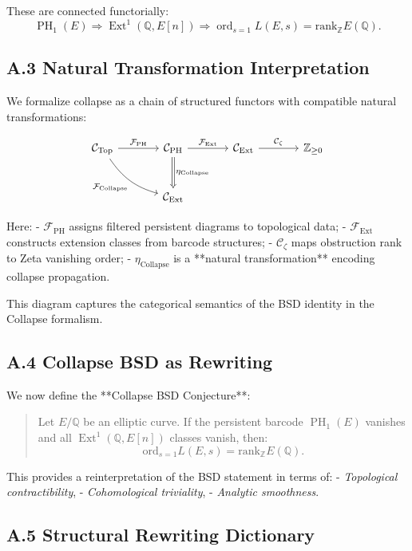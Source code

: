 \documentclass[11pt]{article}
\DeclareMathOperator{\Ext}{Ext}
\DeclareMathOperator{\PH}{PH}
\DeclareMathOperator{\ord}{ord}
\newcommand{\QQ}{\mathbb{Q}}
\newcommand{\ZZ}{\mathbb{Z}}
\begin{document}
These are connected functorially:
\[
\PH_1(E) \Rightarrow \Ext^1(\QQ, E[n]) \Rightarrow \ord_{s=1} L(E,s) = \mathrm{rank}_{\ZZ} E(\QQ).
\]

\subsection*{A.3 Natural Transformation Interpretation}

We formalize collapse as a chain of structured functors with compatible natural transformations:

\[
\begin{tikzcd}[column sep=large, row sep=large]
\mathcal{C}_{\mathrm{Top}} \arrow[r, "\mathcal{F}_{\mathrm{PH}}"]
\arrow[dr, bend right=20, "\mathcal{F}_{\mathrm{Collapse}}"'] &
\mathcal{C}_{\mathrm{PH}} \arrow[d, Rightarrow, "\eta_{\mathrm{Collapse}}"] \arrow[r, "\mathcal{F}_{\mathrm{Ext}}"] &
\mathcal{C}_{\mathrm{Ext}} \arrow[r, "\mathcal{C}_{\zeta}"] &
\mathbb{Z}_{\geq 0} \\
& \mathcal{C}_{\mathrm{Ext}} &
&
\end{tikzcd}
\]

Here:
- $\mathcal{F}_{\mathrm{PH}}$ assigns filtered persistent diagrams to topological data;
- $\mathcal{F}_{\mathrm{Ext}}$ constructs extension classes from barcode structures;
- $\mathcal{C}_{\zeta}$ maps obstruction rank to Zeta vanishing order;
- $\eta_{\mathrm{Collapse}}$ is a **natural transformation** encoding collapse propagation.

This diagram captures the categorical semantics of the BSD identity in the Collapse formalism.

\subsection*{A.4 Collapse BSD as Rewriting}

We now define the **Collapse BSD Conjecture**:

\begin{quote}
Let $E/\QQ$ be an elliptic curve. If the persistent barcode $\PH_1(E)$ vanishes and all $\Ext^1(\QQ,E[n])$ classes vanish, then:
\[
\mathrm{ord}_{s=1} L(E,s) = \mathrm{rank}_{\ZZ} E(\QQ).
\]
\end{quote}

This provides a reinterpretation of the BSD statement in terms of:
- \emph{Topological contractibility},  
- \emph{Cohomological triviality},  
- \emph{Analytic smoothness}.

\subsection*{A.5 Structural Rewriting Dictionary}
\end{document}
